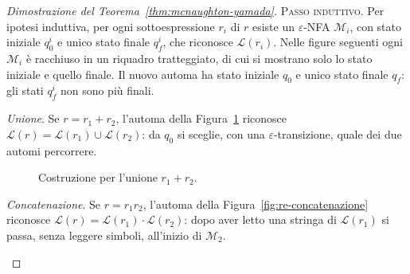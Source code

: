 \documentclass[a4paper, 11pt, oneside]{book}
\theoremstyle{formale}
\begin{document}
\begin{proof}[Dimostrazione del Teorema~\ref{thm:mcnaughton-yamada}]
        \textsc{Passo induttivo}. Per ipotesi induttiva, per ogni sottoespressione $r_i$
        di $r$ esiste un $\varepsilon$-NFA $\mathcal{M}_i$, con stato iniziale $q_0^i$ e
        unico stato finale $q_f^i$, che riconosce $\mathcal{L}(r_i)$. Nelle figure
        seguenti ogni $\mathcal{M}_i$ \`e racchiuso in un riquadro tratteggiato, di cui si
        mostrano solo lo stato iniziale e quello finale. Il nuovo automa ha stato iniziale
        $q_0$ e unico stato finale $q_f$: gli stati $q_f^i$ non sono pi\`u finali.

        \emph{Unione}. Se $r = r_1 + r_2$, l'automa della Figura~\ref{fig:re-unione}
        riconosce $\mathcal{L}(r) = \mathcal{L}(r_1) \cup \mathcal{L}(r_2)$: da $q_0$ si
        sceglie, con una $\varepsilon$-transizione, quale dei due automi percorrere.

        \begin{figure}[H]
            \centering
            \caption{Costruzione per l'unione $r_1 + r_2$.}
            \label{fig:re-unione}
        \end{figure}

        \emph{Concatenazione}. Se $r = r_1 r_2$, l'automa della
        Figura~\ref{fig:re-concatenazione} riconosce $\mathcal{L}(r) = \mathcal{L}(r_1)
        \cdot \mathcal{L}(r_2)$: dopo aver letto una stringa di $\mathcal{L}(r_1)$ si
        passa, senza leggere simboli, all'inizio di $\mathcal{M}_2$.

        \begin{figure}[H]
            \centering
\end{figure}
\end{proof}
\end{document}
